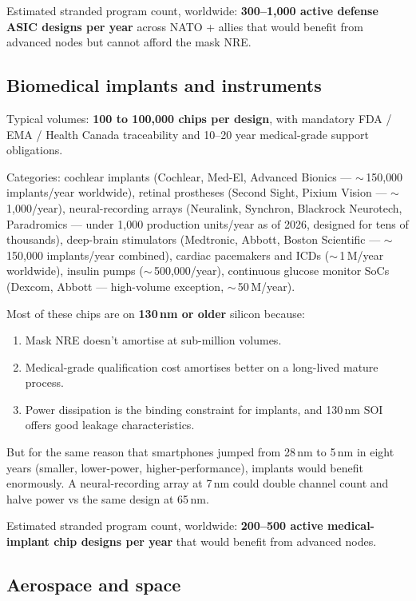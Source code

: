 \documentclass[11pt,letterpaper]{article}
\begin{document}
Estimated stranded program count, worldwide: \textbf{300--1{,}000 active defense ASIC designs per year} across NATO + allies that would benefit from advanced nodes but cannot afford the mask NRE.

\subsection{Biomedical implants and instruments}

Typical volumes: \textbf{100 to 100{,}000 chips per design}, with mandatory FDA / EMA / Health Canada traceability and 10--20 year medical-grade support obligations.

Categories: cochlear implants (Cochlear, Med-El, Advanced Bionics --- $\sim$\,150{,}000 implants/year worldwide), retinal prostheses (Second Sight, Pixium Vision --- $\sim$\,1{,}000/year), neural-recording arrays (Neuralink, Synchron, Blackrock Neurotech, Paradromics --- under 1{,}000 production units/year as of 2026, designed for tens of thousands), deep-brain stimulators (Medtronic, Abbott, Boston Scientific --- $\sim$\,150{,}000 implants/year combined), cardiac pacemakers and ICDs ($\sim$\,1\,M/year worldwide), insulin pumps ($\sim$\,500{,}000/year), continuous glucose monitor SoCs (Dexcom, Abbott --- high-volume exception, $\sim$\,50\,M/year).

Most of these chips are on \textbf{130\,nm or older} silicon because:

\begin{enumerate}[leftmargin=1.6em]
  \item Mask NRE doesn't amortise at sub-million volumes.
  \item Medical-grade qualification cost amortises better on a long-lived mature process.
  \item Power dissipation is the binding constraint for implants, and 130\,nm SOI offers good leakage characteristics.
\end{enumerate}

But for the same reason that smartphones jumped from 28\,nm to 5\,nm in eight years (smaller, lower-power, higher-performance), implants would benefit enormously. A neural-recording array at 7\,nm could double channel count and halve power vs the same design at 65\,nm.

Estimated stranded program count, worldwide: \textbf{200--500 active medical-implant chip designs per year} that would benefit from advanced nodes.

\subsection{Aerospace and space}
\end{document}
